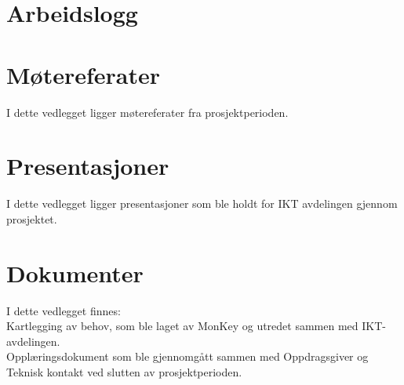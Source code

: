 \documentclass[a4paper,twoside,11pt,pdftex,norsk]{report}
\begin{document}










\clearpage

\small{}
\clearpage


\begin{appendices}
\clearpage
\chapter{Arbeidslogg}\label{app:arbeidslogg}


\chapter{Møtereferater}\label{app:motereferat}
I dette vedlegget ligger møtereferater fra prosjektperioden.


\chapter{Presentasjoner}\label{app:presentasjoner}
I dette vedlegget ligger presentasjoner som ble holdt for IKT avdelingen gjennom prosjektet.




\chapter{Dokumenter}\label{app:dokumenter}
I dette vedlegget finnes:\\ 
\indent Kartlegging av behov, som ble laget av MonKey og utredet sammen med IKT-avdelingen.\\
\indent Opplæringsdokument som ble gjennomgått sammen med Oppdragsgiver og Teknisk kontakt ved slutten av prosjektperioden.





\end{appendices}
\end{document}
